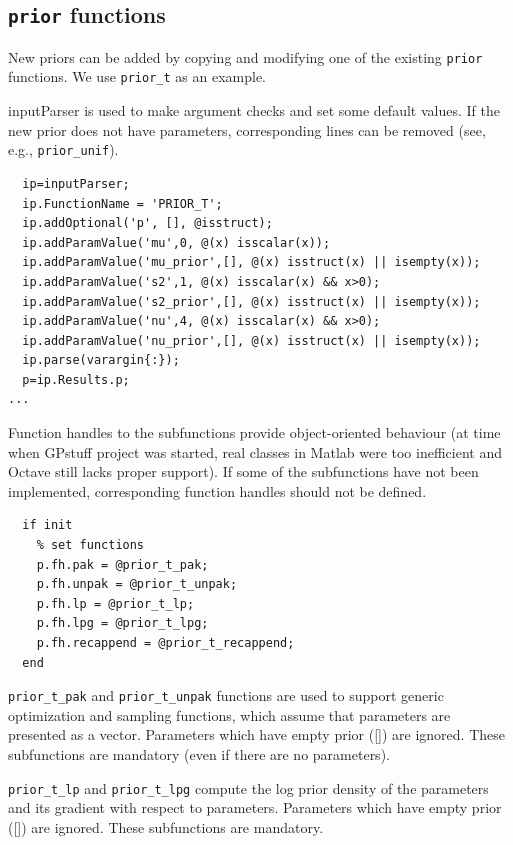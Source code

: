 \documentclass[twoside,11pt]{article}
\newcommand{\code}[1]{{\normalfont\texttt{#1}}}
\begin{document}
\subsection{\code{prior} functions}

New priors can be added by copying and modifying one of the
existing \code{prior} functions. We use \code{prior\_t} as an
example.

inputParser is used to make argument checks and set some default
values. If the new prior does not have parameters,
corresponding lines can be removed (see, e.g., \code{prior\_unif}).

\begin{verbatim}
  ip=inputParser;
  ip.FunctionName = 'PRIOR_T';
  ip.addOptional('p', [], @isstruct);
  ip.addParamValue('mu',0, @(x) isscalar(x));
  ip.addParamValue('mu_prior',[], @(x) isstruct(x) || isempty(x));
  ip.addParamValue('s2',1, @(x) isscalar(x) && x>0);
  ip.addParamValue('s2_prior',[], @(x) isstruct(x) || isempty(x));
  ip.addParamValue('nu',4, @(x) isscalar(x) && x>0);
  ip.addParamValue('nu_prior',[], @(x) isstruct(x) || isempty(x));
  ip.parse(varargin{:});
  p=ip.Results.p;
...
\end{verbatim}
  

Function handles to the subfunctions provide object-oriented
behaviour (at time when GPstuff project was started, real classes
in Matlab were too inefficient and Octave still lacks proper support).
If some of the subfunctions have not been implemented,
corresponding function handles should not be defined.
\begin{verbatim}
  if init
    % set functions
    p.fh.pak = @prior_t_pak;
    p.fh.unpak = @prior_t_unpak;
    p.fh.lp = @prior_t_lp;
    p.fh.lpg = @prior_t_lpg;
    p.fh.recappend = @prior_t_recappend;
  end
\end{verbatim}

\code{prior\_t\_pak} and \code{prior\_t\_unpak} functions are
used to support generic optimization and sampling functions, which
assume that parameters are presented as a vector. Parameters which
have empty prior ([]) are ignored. These subfunctions are
mandatory (even if there are no parameters).

\code{prior\_t\_lp} and \code{prior\_t\_lpg} compute the log
prior density of the parameters and its gradient with respect to
parameters. Parameters which have empty prior ([]) are ignored.
These subfunctions are mandatory.
\end{document}
